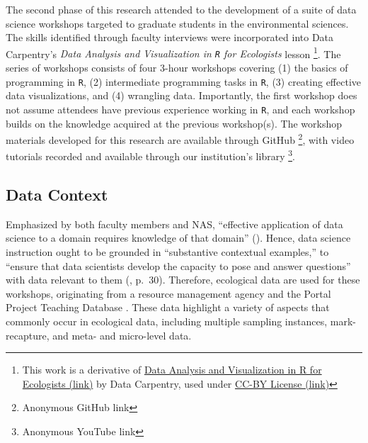 \documentclass[12pt]{article}
\begin{document}
\noindent The second phase of this research attended to the  development of a suite
of data science workshops targeted to graduate students in the environmental
sciences. The skills identified through faculty interviews were incorporated 
into Data Carpentry's \emph{Data Analysis and Visualization in \texttt{R} for
Ecologists} lesson \citep{ecology_curriculum} \footnote{This
work is a derivative of \href{https://datacarpentry.org/R-ecology-lesson}{Data 
Analysis and Visualization in R for Ecologists (link)} by Data Carpentry, used
under \href{https://creativecommons.org/licenses/by/4.0/}{CC-BY License (link)}}.
The series of workshops consists of four 3-hour workshops covering (1) the
basics of programming in \texttt{R}, (2) intermediate programming tasks in 
\texttt{R}, (3) creating effective data visualizations, and (4) wrangling data.
Importantly, the first workshop does not assume attendees have previous
experience working in \texttt{R}, and each workshop builds on the knowledge
acquired at the previous workshop(s). The workshop materials developed for this
research are available through GitHub
\footnote{Anonymous GitHub link}, 
with video tutorials recorded and available through our institution's library  
\footnote{Anonymous YouTube link}. 


\subsection{Data Context}  

\noindent Emphasized by both faculty members and NAS, ``effective
application of data science to a domain requires knowledge of that domain'' 
(\citeyear[p.\ 29]{nas}). Hence, data science instruction ought to be grounded
in ``substantive contextual examples,'' to ``ensure that data scientists develop
the capacity to pose and answer questions'' with data relevant to them
(\citeyear{nas}, p.\ 30). Therefore, ecological data are used for these
workshops, originating from a resource management agency and the
Portal Project Teaching Database \citep{portal_data}.  
These data highlight a variety of aspects that
commonly occur in ecological data, including multiple sampling instances,
mark-recapture, and meta- and micro-level data. 
\end{document}
